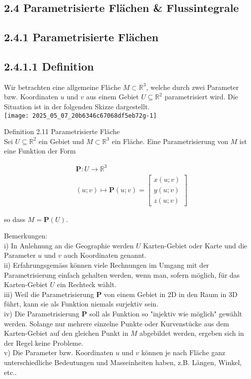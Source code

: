\documentclass[10pt]{article}
\begin{document}
\subsection*{2.4 Parametrisierte Flächen \& Flussintegrale}
\subsection*{2.4.1 Parametrisierte Flächen}
\subsection*{2.4.1.1 Definition}
Wir betrachten eine allgemeine Fläche $M \subset \mathbb{R}^{3}$, welche durch zwei Parameter bzw. Koordinaten $u$ und $v$ aus einem Gebiet $U \subseteq \mathbb{R}^{2}$ parametrisiert wird. Die Situation ist in der folgenden Skizze dargestellt.\\
\texttt{[image: 2025\_05\_07\_20b6346c67068df5eb72g-1]}

Definition 2.11 Parametrisierte Fläche\\
Sei $U \subseteq \mathbb{R}^{2}$ ein Gebiet und $M \subset \mathbb{R}^{3}$ ein Fläche. Eine Parametrisierung von $M$ ist eine Funktion der Form


\begin{align*}
& \mathbf{P}: U \rightarrow \mathbb{R}^{3} \\
& (u ; v) \mapsto \mathbf{P}(u ; v)=\left[\begin{array}{c}
x(u ; v) \\
y(u ; v) \\
z(u ; v)
\end{array}\right] \tag{2.98}
\end{align*}


so dass $M=\mathbf{P}(U)$.

Bemerkungen:\\
i) In Anlehnung an die Geographie werden $U$ Karten-Gebiet oder Karte und die Parameter $u$ und $v$ auch Koordinaten genannt.\\
ii) Erfahrungsgemäss können viele Rechnungen im Umgang mit der Parametrisierung einfach gehalten werden, wenn man, sofern möglich, für das Karten-Gebiet $U$ ein Rechteck wählt.\\
iii) Weil die Parametrisierung $\mathbf{P}$ von einem Gebiet in 2D in den Raum in 3D führt, kann sie als Funktion niemals surjektiv sein.\\
iv) Die Parametrisierung $\mathbf{P}$ soll als Funktion so "injektiv wie möglich" gewählt werden. Solange nur mehrere einzelne Punkte oder Kurvenstücke aus dem Karten-Gebiet auf den gleichen Punkt in $M$ abgebildet werden, ergeben sich in der Regel keine Probleme.\\
v) Die Parameter bzw. Koordinaten $u$ und $v$ können je nach Fläche ganz unterschiedliche Bedeutungen und Masseinheiten haben, z.B. Längen, Winkel, etc..
\end{document}
